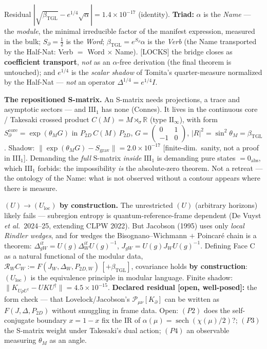 \documentclass[11pt]{article}
\newcommand{\bTGL}{\beta_{\mathrm{TGL}}}\newcommand{\Msun}{M_{\odot}}\newcommand{\TGL}{\mathrm{TGL}}
\theoremstyle{definition}\newtheorem{deriv}{Derivation}
\begin{document}
Residual $|\sqrt{\bTGL}-e^{1/4}\sqrt\alpha|=1.4\times10^{-17}$ (identity). \textbf{Triad:} $\alpha$ is the \emph{Name} --- the \emph{module}, the minimal irreducible factor of the manifest expression, measured in the bulk; $S_\partial=\tfrac12$ is the \emph{Word}; $\bTGL=e^{S_\partial}\alpha$ is the \emph{Verb} (the Name transported by the Half-Nat: Verb $=$ Word $\times$ Name). \textsf{[LOCKS]} the bridge closes as \textbf{coefficient transport}, \emph{not} as an $\alpha$-free derivation (the final theorem is untouched); and $e^{1/4}$ is the \emph{scalar shadow} of Tomita's quarter-measure normalized by the Half-Nat --- \emph{not} an operator $\Delta^{1/4}=e^{1/4}I$.

\textbf{The repositioned S-matrix.} An S-matrix needs projections, a trace and asymptotic sectors --- and $\mathrm{III}_1$ has none (Connes). It lives in the continuous core / Takesaki crossed product $C(M)=M\rtimes_\sigma\mathbb R$ (type $\mathrm{II}_\infty$), with form $S_\partial^{\mathrm{core}}=\exp(\theta_M G)$ in $P_{2D}\,C(M)\,P_{2D}$, $G=\left(\begin{smallmatrix}0&1\\-1&0\end{smallmatrix}\right)$, $|R|^2=\sin^2\theta_M=\bTGL$. Shadow: $\|\exp(\theta_M G)-S_{\mathrm{grav}}\|=2.0\times10^{-17}$ \textsf{[finite-dim.\ sanity, not a proof in III$_1$]}. Demanding the \emph{full} S-matrix \emph{inside} $\mathrm{III}_1$ is demanding pure states $=0_{\mathrm{abs}}$, which $\mathrm{III}_1$ forbids: the impossibility \emph{is} the absolute-zero theorem. Not a retreat --- the ontology of the Name: what is not observed without a contour appears where there is measure.

\textbf{$(U)\to(U_{\mathrm{loc}})$ by construction.} The unrestricted $(U)$ (arbitrary horizons) likely fails --- subregion entropy is quantum-reference-frame dependent (De Vuyst \emph{et al.}\ 2024--25, extending CLPW 2022). But Jacobson (1995) uses only \emph{local Rindler wedges}, and for wedges the Bisognano--Wichmann $+$ Poincar\'e chain is a theorem: $\Delta_{gW}^{it}=U(g)\Delta_W^{it}U(g)^{-1}$, $J_{gW}=U(g)J_W U(g)^{-1}$. Defining Face C as a natural functional of the modular data, $\mathcal R_W C_W:=F(J_W,\Delta_W,P_{2D,W})\,[+\bTGL]$, covariance holds \textbf{by construction}: $(U_{\mathrm{loc}})$ is the equivalence principle in modular language. Finite shadow: $\|K_{U\rho U^{\dagger}}-UKU^{\dagger}\|=4.5\times10^{-15}$. \textbf{Declared residual [open, well-posed]:} the form check --- that Lovelock/Jacobson's $\mathcal P_{\mu\nu}[K_\partial]$ can be written as $F(J,\Delta,P_{2D})$ without smuggling in frame data. Open: $(P2)$ does the self-conjugate boundary $x=1-x$ fix the IR of $\alpha(\mu)=\operatorname{sech}(\chi(\mu)/2)$?; $(P3)$ the S-matrix weight under Takesaki's dual action; $(P4)$ an observable measuring $\theta_M$ as an angle.
\end{document}
